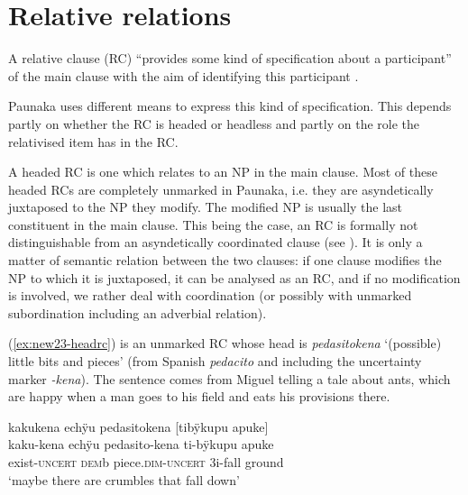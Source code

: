 
\section{Relative relations}\label{sec:RelativeClauses}

A relative clause (RC) “provides some kind of specification about a participant” of the main clause with the aim of identifying this participant \citep[195]{Cristofaro2003}. 

Paunaka uses different means to express this kind of specification. This depends partly on whether the RC is headed or headless and partly on the role the relativised item has in the RC. 


A headed RC is one which relates to an NP in the main clause. Most of these headed RCs are completely unmarked in Paunaka, i.e. they are asyndetically juxtaposed to the NP they modify. The modified NP is usually the last constituent in the main clause. This being the case, an RC is formally not distinguishable from an asyndetically coordinated clause (see ). It is only a matter of semantic relation between the two clauses: if one clause modifies the NP to which it is juxtaposed, it can be analysed as an RC, and if no modification is involved, we rather deal with coordination (or possibly with unmarked subordination including an adverbial relation). %

(\ref{ex:new23-headrc}) is an unmarked RC whose head is \textit{pedasitokena} ‘(possible) little bits and pieces’ (from Spanish \textit{pedacito} and including the uncertainty marker \textit{-kena}). The sentence comes from Miguel telling a tale about ants, which are happy when a man goes to his field and eats his provisions there.

\ea\label{ex:new23-headrc}
\begingl
\glpreamble kakukena echÿu pedasitokena \textup{[}tibÿkupu apuke\textup{]}\\
\gla kaku-kena echÿu pedasito-kena ti-bÿkupu apuke\\
\glb exist-\textsc{uncert} \textsc{dem}b piece.\textsc{dim}-\textsc{uncert} 3i-fall ground\\
\glft ‘maybe there are crumbles that fall down’
\endgl
{}
\xe
{}

